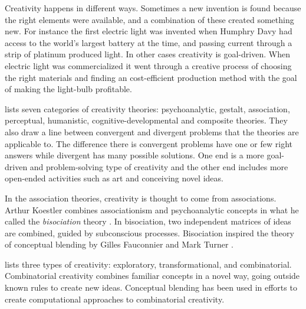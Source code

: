 Creativity happens in different ways. Sometimes a new invention is found because the right elements were available, and a combination of these created something new. For instance the first electric light was invented when Humphry Davy had access to the world's largest battery at the time, and passing current through a strip of platinum produced light. In other cases creativity is goal-driven. When electric light was commercialized it went through a creative process of choosing the right materials and finding an cost-efficient production method with the goal of making the light-bulb profitable.

\citet{busse1980theories} lists seven categories of creativity theories: psychoanalytic, gestalt, association, perceptual, humanistic, cognitive-developmental and composite theories.
They also draw a line between convergent and divergent problems that the theories are applicable to. The difference there is convergent problems have one or few right answers while divergent has many possible solutions. One end is a more goal-driven and problem-solving type of creativity and the other end includes more open-ended activities such as art and conceiving novel ideas.

In the association theories, creativity is thought to come from associations. Arthur Koestler combines associationism and psychoanalytic concepts in what he called the \emph{bisociation} theory \parencite{busse1980theories}. In bisociation, two independent matrices of ideas are combined, guided by subconscious processes. Bisociation inspired the theory of conceptual blending by Gilles Fauconnier and Mark Turner \parencite{fauconnier2002way}.

\citet{boden2004creative} lists three types of creativity: exploratory, transformational, and combinatorial. Combinatorial creativity combines familiar concepts in a novel way, going outside known rules to create new ideas. Conceptual blending has been used in efforts to create computational approaches to combinatorial creativity.




